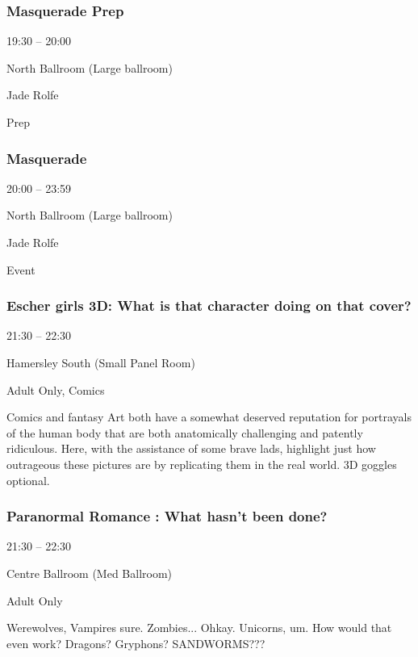 \documentclass{scrreprt}
\begin{document}
\begin{multicols}{2}
\subsubsection*{Masquerade Prep}\begin{description}
\setlength{\itemsep}{0pt}
\setlength{\parsep}{0pt}
\setlength{\parskip}{0pt}
\item[Time:]{19:30 -- 20:00}
\item[Venue:]{North Ballroom (Large ballroom)}
\item[People:]{Jade Rolfe}
\item[Tags:]{Prep}\end{description}

\subsubsection*{Masquerade}\begin{description}
\setlength{\itemsep}{0pt}
\setlength{\parsep}{0pt}
\setlength{\parskip}{0pt}
\item[Time:]{20:00 -- 23:59}
\item[Venue:]{North Ballroom (Large ballroom)}
\item[People:]{Jade Rolfe}
\item[Tags:]{Event}\end{description}

\subsubsection*{Escher girls 3D: What is that character doing on that cover?}\begin{description}
\setlength{\itemsep}{0pt}
\setlength{\parsep}{0pt}
\setlength{\parskip}{0pt}
\item[Time:]{21:30 -- 22:30}
\item[Venue:]{Hamersley South (Small Panel Room)}
\item[Tags:]{Adult Only, Comics}\end{description}
Comics and fantasy Art both have a somewhat deserved reputation for portrayals of the human body that are both anatomically challenging and patently ridiculous. Here, with the assistance of some brave lads, highlight just how outrageous these pictures are by replicating them in the real world. 3D goggles optional.
\subsubsection*{Paranormal Romance : What hasn't been done?}\begin{description}
\setlength{\itemsep}{0pt}
\setlength{\parsep}{0pt}
\setlength{\parskip}{0pt}
\item[Time:]{21:30 -- 22:30}
\item[Venue:]{Centre Ballroom (Med Ballroom)}
\item[Tags:]{Adult Only}\end{description}
Werewolves, Vampires sure. Zombies... Ohkay. Unicorns, um. How would that even work? Dragons? Gryphons? SANDWORMS???

\end{multicols}
\end{document}
